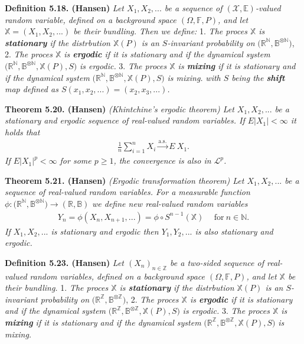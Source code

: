 \documentclass[
]{book}
\begin{document}
\textbf{Definition 5.18. (Hansen)} \emph{Let \(X_1,X_2,...\) be a sequence of \((\mathcal{X},\mathbb{E})\)-valued random variable, defined on a background space \((\Omega,\mathbb{F},P)\), and let \(\mathbb{X}=(X_1,X_2,...)\) be their bundling. Then we define:}
1. \emph{The proces \(\mathbb{X}\) is \textbf{stationary} if the distrbution \(\mathbb{X}(P)\) is an \(S\)-invariant probability on} \(\Big(\mathbb{R}^{\mathbb{N}},\mathbb{B}^{\otimes \mathbb{N}}\Big)\),
2. \emph{The proces \(\mathbb{X}\) is \textbf{ergodic} if it is stationary and if the dynamical system} \(\Big(\mathbb{R}^{\mathbb{N}},\mathbb{B}^{\otimes \mathbb{N}},\mathbb{X}(P),S\Big)\) \emph{is ergodic.}
3. \emph{The proces \(\mathbb{X}\) is \textbf{mixing} if it is stationary and if the dynamical system} \(\Big(\mathbb{R}^{\mathbb{N}},\mathbb{B}^{\otimes \mathbb{N}},\mathbb{X}(P),S\Big)\) \emph{is mixing.}
\emph{with \(S\) being the \textbf{shift} map defined as \(S(x_1,x_2,...)=(x_2,x_3,...)\).}

\textbf{Theorem 5.20. (Hansen)} \emph{(Khintchine's ergodic theorem) Let \(X_1,X_2,...\) be a stationary and ergodic sequence of real-valued random variables. If \(E\vert X_1\vert <\infty\) it holds that}
\begin{align*}
    \frac{1}{n}\sum_{i=1}^nX_i\stackrel{\text{a.s.}}{\to} E\ X_1.\tag{5.27}
\end{align*}
\emph{If \(E\vert X_1\vert ^p<\infty\) for some \(p\ge 1\), the convergence is also in \(\mathcal{L}^p\).}

\textbf{Theorem 5.21. (Hansen)} \emph{(Ergodic transformation theorem) Let \(X_1,X_2,...\) be a sequence of real-valued random variables. For a measurable function} \(\phi : \big(\mathbb{R}^{\mathbb{N}},\mathbb{B}^{\otimes\mathbb{N}}\big)\to (\mathbb{R},\mathbb{B})\) \emph{we define new real-valued random variables}
\begin{align*}
    Y_n=\phi(X_n,X_{n+1},...)=\phi\circ S^{n-1}(\mathbb{X})\hspace{15pt}\text{for}\ n\in\mathbb{N}.
\end{align*}
\emph{If \(X_1,X_2,...\) is stationary and ergodic then \(Y_1,Y_2,...\) is also stationary and ergodic.}

\textbf{Definition 5.23. (Hansen)} \emph{Let \((X_n)_{n\in\mathbb{Z}}\) be a two-sided sequence of real-valued random variables, defined on a background space \((\Omega,\mathbb{F},P)\), and let \(\mathbb{X}\) be their bundling.}
1. \emph{The proces \(\mathbb{X}\) is \textbf{stationary} if the distrbution \(\mathbb{X}(P)\) is an \(S\)-invariant probability on} \(\Big(\mathbb{R}^{\mathbb{Z}},\mathbb{B}^{\otimes \mathbb{Z}}\Big)\),
2. \emph{The proces \(\mathbb{X}\) is \textbf{ergodic} if it is stationary and if the dynamical system} \(\Big(\mathbb{R}^{\mathbb{Z}},\mathbb{B}^{\otimes \mathbb{Z}},\mathbb{X}(P),S\Big)\) \emph{is ergodic.}
3. \emph{The proces \(\mathbb{X}\) is \textbf{mixing} if it is stationary and if the dynamical system} \(\Big(\mathbb{R}^{\mathbb{Z}},\mathbb{B}^{\otimes \mathbb{Z}},\mathbb{X}(P),S\Big)\) \emph{is mixing.}
\end{document}
